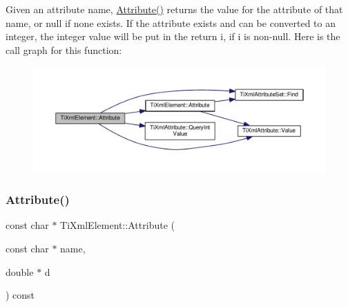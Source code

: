 Given an attribute name, \hyperlink{class_ti_xml_element_a6042f518748f475a7ac4b4e0b509eb05}{Attribute()} returns the value for the attribute of that name, or null if none exists. If the attribute exists and can be converted to an integer, the integer value will be put in the return \textquotesingle{}i\textquotesingle{}, if \textquotesingle{}i\textquotesingle{} is non-\/null. Here is the call graph for this function\+:\nopagebreak
\begin{figure}[H]
\begin{center}
\leavevmode
\includegraphics[width=350pt]{class_ti_xml_element_a8005d0b808fd02bd1246710cdf95e5f6_cgraph}
\end{center}
\end{figure}
\mbox{\label{class_ti_xml_element_a09df893402d0ab1402c8725e6d30ec04}} 
\subsubsection{\texorpdfstring{Attribute()}{Attribute()}\hspace{0.1cm}{\footnotesize\ttfamily [3/3]}}
{\footnotesize\ttfamily const char $\ast$ Ti\+Xml\+Element\+::\+Attribute (\begin{DoxyParamCaption}\item[{const char $\ast$}]{name,  }\item[{double $\ast$}]{d }\end{DoxyParamCaption}) const}

